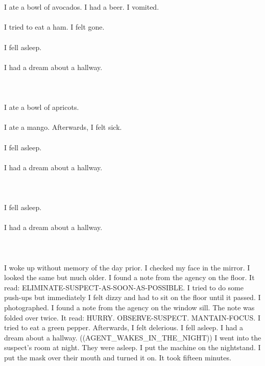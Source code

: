 \documentclass{article}
\begin{document}
    \section{}
    I ate a bowl of avocados. I had a beer. I vomited.\\\\I tried to eat a ham. I felt gone.\\\\I fell asleep.\\\\I had a dream about a hallway.\\\\ 
    \newpage
    
    \section{}
    I ate a bowl of apricots.\\\\I ate a mango. Afterwards, I felt sick.\\\\I fell asleep.\\\\I had a dream about a hallway.\\\\ 
    \newpage
    
    \section{}
    I fell asleep.\\\\I had a dream about a hallway.\\\\ 
    \newpage
    
    \section{}
    I woke up without memory of the day prior. I checked my face in the mirror. I looked the same but much older. I found a note from the agency on the floor. It read: ELIMINATE-SUSPECT-AS-SOON-AS-POSSIBLE. I tried to do some push-ups but immediately I felt dizzy and had to sit on the floor until it passed. I photographed. I found a note from the agency on the window sill. The note was folded over twice. It read: HURRY. OBSERVE-SUSPECT. MANTAIN-FOCUS. I tried to eat a green pepper. Afterwards, I felt delerious. I fell asleep. I had a dream about a hallway. ((AGENT_WAKES_IN_THE_NIGHT)) I went into the suspect's room at night. They were asleep. I put the machine on the nightstand. I put the mask over their mouth and turned it on. It took fifteen minutes. \\\\
    \newpage
    
\end{document}
